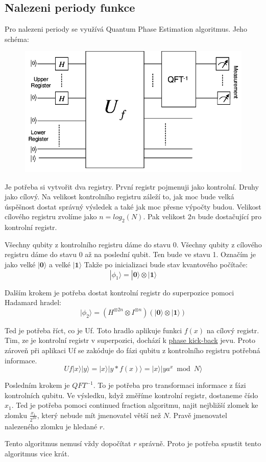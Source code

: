 \documentclass[11pt]{article}
\begin{document}
\subsection{Nalezeni periody funkce}
Pro nalezeni periody se využívá Quantum Phase Estimation algoritmus. Jeho schéma:
\begin{figure}[H]
    \includegraphics[scale=.5]{High-level-diagram-of-Shors-algorithm-Upper-register-consists-of-2n-qubits-and-holds}
    \centering
\end{figure}
\par Je potřeba si vytvořit dva registry. První registr pojmenuji jako kontrolní. Druhy jako cílový.
Na velikost kontrolního registru záleží to, jak moc bude velká úspěšnost dostat správný výsledek a také jak moc přesne výpočty budou.
Velikost cílového registru zvolíme jako $n = log_2(N)$.
Pak velikost $2n$ bude dostačující pro kontrolní registr.
\par Všechny qubity z kontrolního registru dáme do stavu $0$. Všechny qubity z cílového registru dáme do stavu $0$ až na poslední qubit. Ten bude ve stavu 1.
Označím je jako velké $|\textbf{0}\rangle$ a velké $|\textbf{1}\rangle$
Takže po inicializaci bude stav kvantového počítače:
$$|\phi_1\rangle = |\textbf{0}\rangle\otimes|\textbf{1}\rangle$$
\par Dalším krokem je potřeba dostat kontrolní registr do superpozice pomoci Hadamard hradel:
$$|\phi_2\rangle = (H^{\otimes 2n}\otimes I^{\otimes n})(|\textbf{0}\rangle\otimes|\textbf{1}\rangle)$$
\par Ted je potřeba říct, co je Uf. Toto hradlo aplikuje funkci $f(x)$ na cílový registr.
Tim, ze je kontrolní registr v superpozici, dochází k \hyperref[sec:phase_kickback]{phase kick-back} jevu.
Proto zároveň při aplikaci Uf se zakóduje do fázi qubitu z kontrolního registru potřebná informace.
$$Uf|x\rangle|y\rangle = |x\rangle|y*f(x)\rangle = |x\rangle|ya^x \bmod N \rangle$$
\par Posledním krokem je $QFT^{-1}$.
To je potřeba pro transformaci informace z fázi kontrolních qubitu.
Ve výsledku, když změříme kontrolní registr, dostaneme číslo $x_1$.
Ted je potřeba pomoci continued fraction algoritmu, najit nejbližší zlomek ke zlomku $\frac{x_1}{2^{2n}}$, který nebude mít jmenovatel větší než $N$.
Pravě jmenovatel nalezeného zlomku je hledané $r$.
\par Tento algoritmus nemusí vždy dopočítat $r$ správně.
Proto je potřeba spustit tento algoritmus vice krát.
\end{document}
